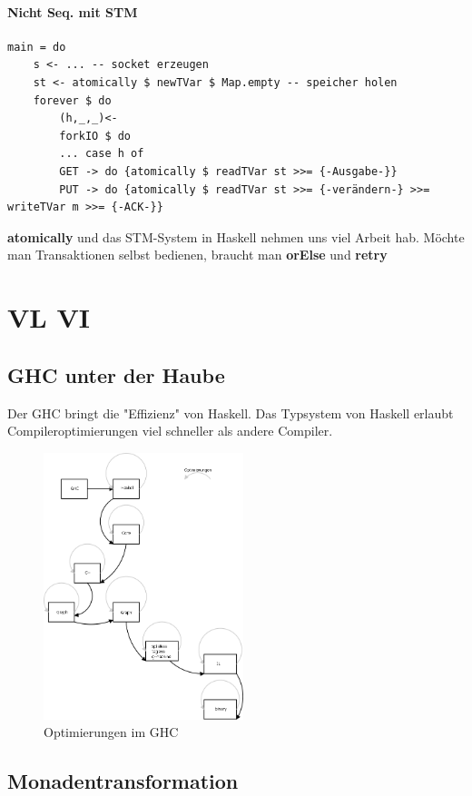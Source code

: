 \documentclass[ngerman,a4paper]{report}
\begin{document}
\subsubsection{Nicht Seq. mit STM}
\begin{lstlisting}
main = do
	s <- ... -- socket erzeugen
	st <- atomically $ newTVar $ Map.empty -- speicher holen
	forever $ do
		(h,_,_)<-
		forkIO $ do
		... case h of
		GET -> do {atomically $ readTVar st >>= {-Ausgabe-}}
		PUT -> do {atomically $ readTVar st >>= {-verändern-} >>= writeTVar m >>= {-ACK-}}
\end{lstlisting}

\textbf{atomically} und das STM-System in Haskell nehmen uns viel Arbeit hab. Möchte man Transaktionen selbst bedienen, braucht man \textbf{orElse} und \textbf{retry}\\

\chapter{VL VI}
\section{GHC unter der Haube}
Der GHC bringt die "Effizienz" von Haskell. Das Typsystem von Haskell erlaubt Compileroptimierungen viel schneller als andere Compiler.\\

\begin{figure}[h!]
	\centering
	\includegraphics[width=220px]{gfx/GHC_uh.png}
	\caption{Optimierungen im GHC}
	\label{img:ghc-opt}
\end{figure}

\section{Monadentransformation}
\end{document}
